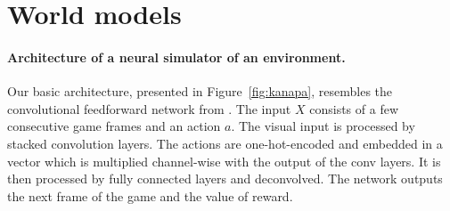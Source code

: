\section{World models}
\label{sec:architectures}
\label{sec:training}



\paragraph{Architecture of a neural simulator of an environment. } Our basic architecture, presented in Figure~\ref{fig:kanapa}, resembles the convolutional feedforward network from \cite{video_prediction}.  The input $X$ consists of a few consecutive game frames and an action $a$. The visual input is processed by stacked convolution layers. The actions are one-hot-encoded and embedded in a vector which is multiplied channel-wise with the output of the conv layers. It is then processed by fully connected layers and deconvolved. The network outputs the next frame of the game and the value of reward.%

